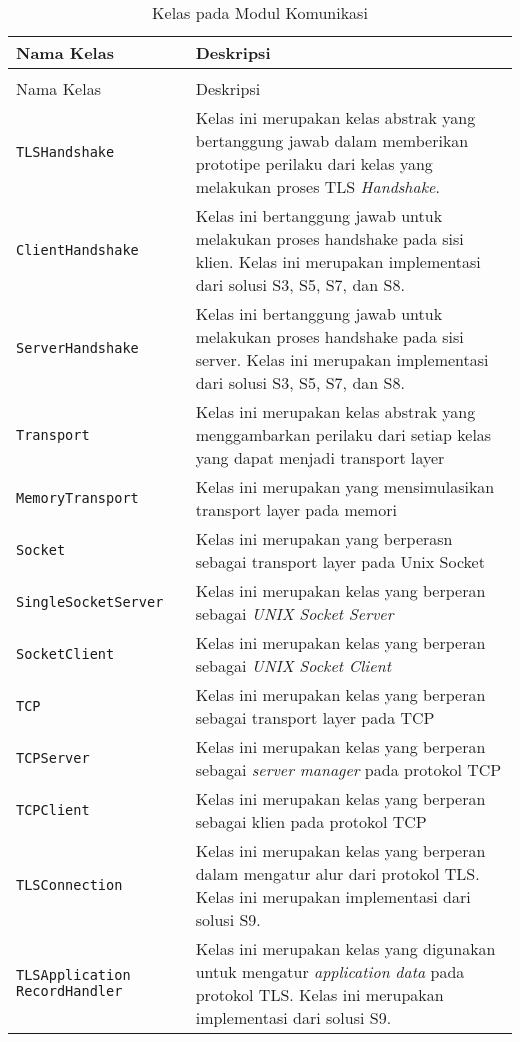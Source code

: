 \begin{longtable}{|p{4cm}|p{8cm}|}
  \caption{Kelas pada Modul Komunikasi} \label{tab:impl.comm} \\
  \hline
  \textbf{Nama Kelas} & \textbf{Deskripsi} \\ \hline
  \endfirsthead
  \caption[]{Kelas pada Modul Komunikasi} \\

  \hline
    Nama Kelas & Deskripsi \\ \hline
    \endhead

    \texttt{TLSHandshake} & Kelas ini merupakan kelas abstrak yang bertanggung jawab dalam memberikan prototipe perilaku dari kelas yang melakukan proses TLS \emph{Handshake}.\\ \hline
    \texttt{ClientHandshake} & Kelas ini bertanggung jawab untuk melakukan proses handshake pada sisi klien. Kelas ini merupakan implementasi dari solusi S3, S5, S7, dan S8.\\ \hline
    \texttt{ServerHandshake} & Kelas ini bertanggung jawab untuk melakukan proses handshake pada sisi server. Kelas ini merupakan implementasi dari solusi S3, S5, S7, dan S8.\\ \hline
    \texttt{Transport} & Kelas ini merupakan kelas abstrak yang menggambarkan perilaku dari setiap kelas yang dapat menjadi transport layer\\ \hline
    \texttt{MemoryTransport} & Kelas ini merupakan yang mensimulasikan transport layer pada memori\\ \hline
    \texttt{Socket} & Kelas ini merupakan yang berperasn sebagai transport layer pada Unix Socket\\ \hline
    \texttt{SingleSocketServer} & Kelas ini merupakan kelas yang berperan sebagai \emph{UNIX Socket Server}\\ \hline
    \texttt{SocketClient} & Kelas ini merupakan kelas yang berperan sebagai \emph{UNIX Socket Client}\\ \hline
    \texttt{TCP} & Kelas ini merupakan kelas yang berperan sebagai transport layer pada TCP\\ \hline
    \texttt{TCPServer} & Kelas ini merupakan kelas yang berperan sebagai \emph{server manager} pada protokol TCP\\ \hline
    \texttt{TCPClient} & Kelas ini merupakan kelas yang berperan sebagai klien pada protokol TCP\\ \hline
    \texttt{TLSConnection} & Kelas ini merupakan kelas yang berperan dalam mengatur alur dari protokol TLS. Kelas ini merupakan implementasi dari solusi S9.\\ \hline
    \texttt{TLSApplication} \texttt{RecordHandler} & Kelas ini merupakan kelas yang digunakan untuk mengatur \emph{application data} pada protokol TLS. Kelas ini merupakan implementasi dari solusi S9.\\ \hline
\end{longtable}
  
